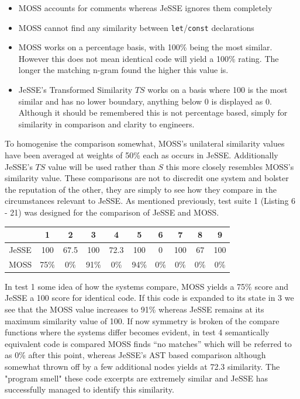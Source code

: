 \documentclass[jou,apacite]{apa6}
\begin{document}
\begin{itemize}
  \setlength\itemsep{-0.5em}
  \item MOSS accounts for comments whereas JeSSE ignores them completely 
  \item MOSS cannot find any similarity between \texttt{let}/\texttt{const} declarations
  \item MOSS works on a percentage basis, with 100\% being the most similar. However this does not mean identical code will yield a 100\% rating. The longer the matching n-gram found the higher this value is.
  \item JeSSE's Transformed Similarity $TS$ works on a basis where 100 is the most similar and has no lower boundary, anything below 0 is displayed as 0. Although it should be remembered this is not percentage based, simply for similarity in comparison and clarity to engineers. 
\end{itemize}

To homogenise the comparison somewhat, MOSS's unilateral similarity values have been averaged at weights of 50\% each as occurs in JeSSE. Additionally JeSSE's $TS$ value will be used rather than $S$ this more closely resembles MOSS's similarity value. These comparisons are not to discredit one system and bolster the reputation of the other, they are simply to see how they compare in the circumstances relevant to JeSSE. As mentioned previously, test suite 1 (Listing 6 - 21) was designed for the comparison of JeSSE and MOSS.

\setlength{\tabcolsep}{4pt}
\renewcommand{\arraystretch}{1.5}

\begin{center}
 \begin{tabular}{||c c c c c c c c c c||} 
 \hline
  & 1 & 2 & 3 & 4 & 5 & 6 & 7 & 8 & 9 \\ [-0.2ex] 
 \hline\hline
 JeSSE & 100 & 67.5 & 100 & 72.3 & 100 & 0 & 100 & 67 & 100 \\ 
 \hline
 MOSS  & 75\% & 0\% & 91\% & 0\% & 94\% & 0\% & 0\%  & 0\% & 0\%\\
 \hline
\end{tabular}
\end{center}

In test 1 some idea of how the systems compare, MOSS yields a 75\% score and JeSSE a 100 score for identical code. If this code is expanded to its state in 3 we see that the MOSS value increases to 91\% whereas JeSSE remains at its maximum similarity value of 100. If now symmetry is broken  of the compare functions where the systems differ becomes evident, in test 4 semantically equivalent code is compared MOSS finds “no matches” which will be referred to as 0\% after this point, whereas JeSSE's AST based comparison although somewhat thrown off by a few additional nodes yields at 72.3 similarity. The "program smell" these code excerpts are extremely similar and JeSSE has successfully managed to identify this similarity. 
\end{document}
